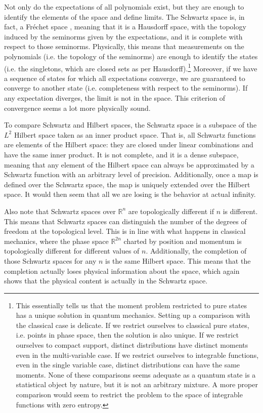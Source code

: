 \documentclass[10pt,twocolumn, nofootinbib]{revtex4-2}
\begin{document}
Not only do the expectations of all polynomials exist, but they are enough to identify the elements of the space and define limits. The Schwartz space is, in fact, a Fréchet space \cite[Theorem V.9]{reed_methods_1980}, meaning that it is a Hausdorff space, with the topology induced by the seminorms given by the expectations, and it is complete with respect to those seminorms. Physically, this means that measurements on the polynomials (i.e. the topology of the seminorms) are enough to identify the states (i.e. the singletons, which are closed sets as per Hausdorff).\footnote{This essentially tells us that the moment problem restricted to pure states has a unique solution in quantum mechanics. Setting up a comparison with the classical case is delicate. If we restrict ourselves to classical pure states, i.e. points in phase space, then the solution is also unique. If we restrict ourselves to compact support, distinct distributions have distinct moments even in the multi-variable case.\cite{moment_problem_2017} If we restrict ourselves to integrable functions, even in the single variable case, distinct distributions can have the same moments. None of these comparisons seems adequate as a quantum state is a statistical object by nature, but it is not an arbitrary mixture. A more proper comparison would seem to restrict the problem to the space of integrable functions with zero entropy.} Moreover, if we have a sequence of states for which all expectations converge, we are guaranteed to converge to another state (i.e. completeness with respect to the seminorms). If any expectation diverges, the limit is not in the space. This criterion of convergence seems a lot more physically sound.

To compare Schwartz and Hilbert spaces, the Schwartz space is a subspace of the $L^2$ Hilbert space taken as an inner product space. That is, all Schwartz functions are elements of the Hilbert space: they are closed under linear combinations and have the same inner product. It is not complete, and it is a dense subspace, meaning that any element of the Hilbert space can always be approximated by a Schwartz function with an arbitrary level of precision. Additionally, once a map is defined over the Schwartz space, the map is uniquely extended over the Hilbert space. It would then seem that all we are losing is the behavior at actual infinity.

Also note that Schwartz spaces over $\mathbb{R}^n$ are topologically different if $n$ is different. This means that Schwartz spaces can distinguish the number of the degrees of freedom at the topological level. This is in line with what happens in classical mechanics, where the phase space $\mathbb{R}^{2n}$ charted by position and momentum is topologically different for different values of $n$. Additionally, the completion of those Schwartz spaces for any $n$ is the same Hilbert space. This means that the completion actually loses physical information about the space, which again shows that the physical content is actually in the Schwartz space.
\end{document}
